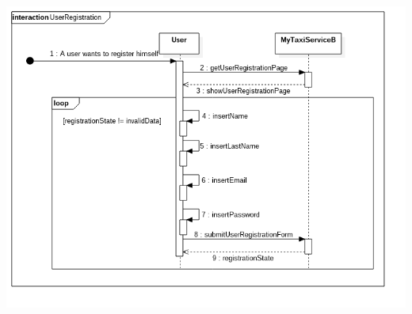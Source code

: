 \documentclass[11pt,titlepage]{article} %
\begin{document}
\begin{enumerate}
\begin{center}
		\includegraphics[scale=0.52]{usecase8.png}
		\end{center}



\end{enumerate}
\end{document}
